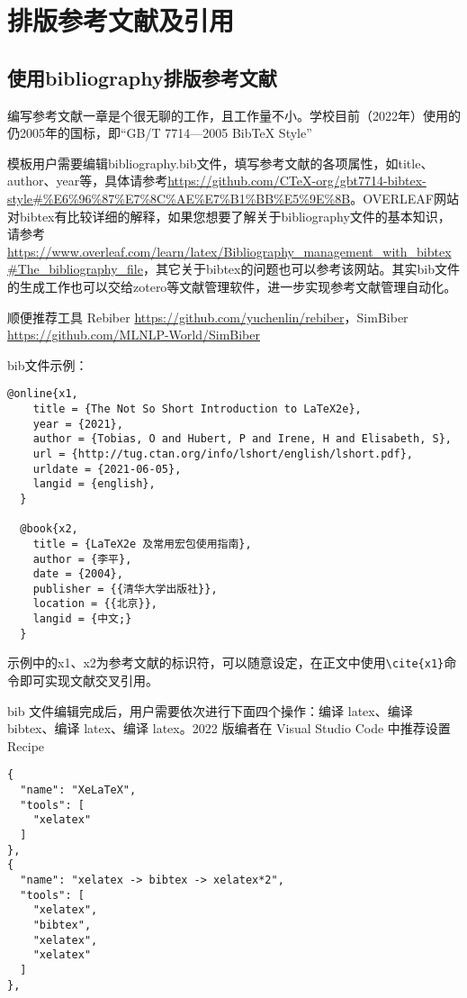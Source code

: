 \section{排版参考文献及引用}\label{sec:ref}

\subsection{使用bibliography排版参考文献}

编写参考文献一章是个很无聊的工作，且工作量不小。学校目前（2022年）使用的仍2005年的国标，即“GB/T 7714—2005 BibTeX Style”

模板用户需要编辑bibliography.bib文件，填写参考文献的各项属性，如title、author、year等，具体请参考\url{https://github.com/CTeX-org/gbt7714-bibtex-style#%E6%96%87%E7%8C%AE%E7%B1%BB%E5%9E%8B}。OVERLEAF网站对bibtex有比较详细的解释，如果您想要了解关于bibliography文件的基本知识，请参考\url{https://www.overleaf.com/learn/latex/Bibliography_management_with_bibtex#The_bibliography_file}，其它关于bibtex的问题也可以参考该网站。其实bib文件的生成工作也可以交给zotero等文献管理软件，进一步实现参考文献管理自动化。

顺便推荐工具 Rebiber \url{https://github.com/yuchenlin/rebiber}，SimBiber \url{https://github.com/MLNLP-World/SimBiber}

bib文件示例：
{
\color{green!50!black}
\begin{lstlisting}[breaklines=true,]
  @online{x1,
    title = {The Not So Short Introduction to LaTeX2e},
    year = {2021},
    author = {Tobias, O and Hubert, P and Irene, H and Elisabeth, S},
    url = {http://tug.ctan.org/info/lshort/english/lshort.pdf},
    urldate = {2021-06-05},
    langid = {english},
  }

  @book{x2,
    title = {LaTeX2e 及常用宏包使用指南},
    author = {李平},
    date = {2004},
    publisher = {{清华大学出版社}},
    location = {{北京}},
    langid = {中文;}
  }
\end{lstlisting}
}

示例中的x1、x2为参考文献的标识符，可以随意设定，在正文中使用\verb|\cite{x1}|命令即可实现文献交叉引用。

bib 文件编辑完成后，用户需要依次进行下面四个操作：编译 latex、编译 bibtex、编译 latex、编译 latex。2022 版编者在 Visual Studio Code 中推荐设置 Recipe

{
\color{green!50!black}
\begin{lstlisting}[breaklines=true,]
{
  "name": "XeLaTeX",
  "tools": [
    "xelatex"
  ]
},
{
  "name": "xelatex -> bibtex -> xelatex*2",
  "tools": [
    "xelatex",
    "bibtex",
    "xelatex",
    "xelatex"
  ]
},
\end{lstlisting}
}

